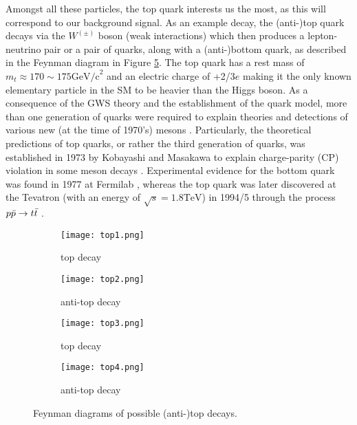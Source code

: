 Amongst all these particles, the top quark interests us the most, as this will correspond to our background signal. As an example decay, the (anti-)top quark decays via the $W^{(\pm)}$ boson (weak interactions) which then produces a lepton-neutrino pair or a pair of quarks, along with a (anti-)bottom quark, as described in the Feynman diagram in Figure \ref{fig:decayDiag}. The top quark has a rest mass of $m_t\approx170\sim175\text{GeV/c}^2$ and an electric charge of +2/3$e$ \cite{tanabashi2018review} making it the only known elementary particle in the SM to be heavier than the Higgs boson. As a consequence of the GWS theory and the establishment of the quark model, more than one generation of quarks were required to explain theories and detections of various new (at the time of 1970's) mesons \cite{griffiths2008introduction}. Particularly, the theoretical predictions of top quarks, or rather the third generation of quarks, was established in 1973 by Kobayashi and Masakawa to explain charge-parity (CP) violation in some meson decays \cite{griffiths2008introduction, kobayashi1973cp}. Experimental evidence for the bottom quark was found in 1977 at Fermilab \cite{herb1977observation}, whereas the top quark was later discovered at the Tevatron (with an energy of $\sqrt{s}=1.8\text{TeV}$) in 1994/5 through the process $p\Bar{p} \rightarrow t\Bar{t}$ \cite{abachi1994search, coll1994evidence, abachi1995observation}.

\begin{figure}[htbp]
    \centering
    \begin{subfigure}{0.2\linewidth}
        \texttt{[image: top1.png]}
        \caption{top decay}
        \label{fig:top1}
    \end{subfigure}
    \begin{subfigure}{0.2\linewidth}
        \texttt{[image: top2.png]}
        \caption{anti-top decay}
        \label{fig:anttop1}
    \end{subfigure}
    \begin{subfigure}{0.2\linewidth}
        \texttt{[image: top3.png]}
        \caption{top decay}
        \label{fig:top2}
    \end{subfigure}
    \begin{subfigure}{0.2\linewidth}
        \texttt{[image: top4.png]}
        \caption{anti-top decay}
        \label{fig:anttop2}
    \end{subfigure}
    \caption{Feynman diagrams of possible (anti-)top decays.}
    \label{fig:decayDiag}
\end{figure}


